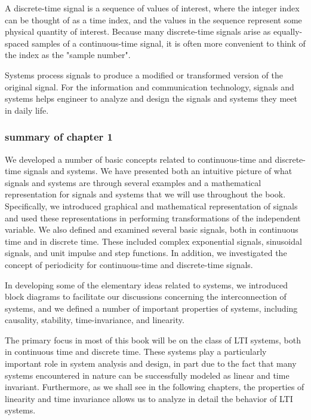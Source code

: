 \documentclass[koma,utopia,letterpaper,captions=tableheading,11pt,listings-sv,microtype,paralist,colorlinks=true,urlcolor=blue]{org-article}
\begin{document}
A discrete-time signal is a sequence of values of interest, where the integer
index can be thought of as a time index, and the values in the sequence
represent some physical quantity of interest. Because many discrete-time signals
arise as equally-spaced samples of a continuous-time signal, it is often more
convenient to think of the index as the "sample number".

Systems process signals to produce a modified or transformed version of the
original signal. For the information and communication technology, signals and
systems helps engineer to analyze and design the signals and systems they meet
in daily life.






\subsubsection{summary of chapter 1}
\label{sec:orgde426c3}


We developed a number of basic concepts related to continuous-time and
discrete-time signals and systems. We have presented both an intuitive picture
of what signals and systems are through several examples and a mathematical
representation for signals and systems that we will use throughout the book.
Specifically, we introduced graphical and mathematical representation of signals
and used these representations in performing transformations of the independent
variable. We also defined and examined several basic signals, both in continuous
time and in discrete time. These included complex exponential signals,
sinusoidal signals, and unit impulse and step functions. In addition, we
investigated the concept of periodicity for continuous-time and discrete-time
signals.

In developing some of the elementary ideas related to systems, we introduced
block diagrams to facilitate our discussions concerning the interconnection of
systems, and we defined a number of important properties of systems, including
causality, stability, time-invariance, and linearity.

The primary focus in most of this book will be on the class of LTI systems, both
in continuous time and discrete time. These systems play a particularly
important role in system analysis and design, in part due to the fact that many
systems encountered in nature can be successfully modeled as linear and time
invariant. Furthermore, as we shall see in the following chapters, the
properties of linearity and time invariance allows us to analyze in detail the
behavior of LTI systems.
\end{document}
